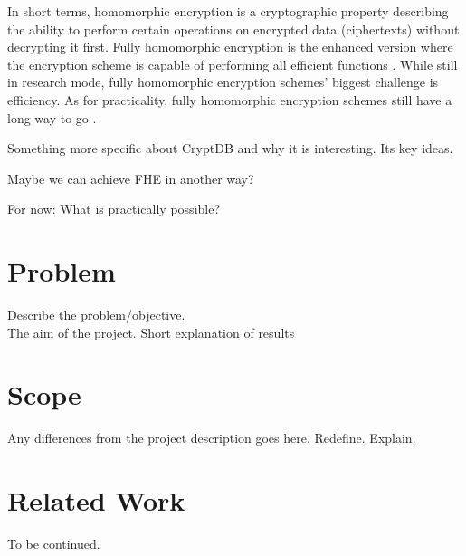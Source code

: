 In short terms, homomorphic encryption is a cryptographic property describing the ability to perform certain operations on encrypted data (ciphertexts) without decrypting it first. Fully homomorphic encryption is the enhanced version where the encryption scheme is capable of performing all efficient functions \cite{Gentry_thesis}. While still in research mode, fully homomorphic encryption schemes' biggest challenge is efficiency. As for practicality, fully homomorphic encryption schemes still have a long way to go \cite{naehrig2011can}.

Something more specific about CryptDB and why it is interesting. Its key ideas.

Maybe we can achieve FHE in another way?

For now: What is practically possible?

\section{Problem}

Describe the problem/objective.\\
The aim of the project.
Short explanation of results

\section{Scope}

Any differences from the project description goes here. Redefine. Explain.

\section{Related Work}

To be continued. 